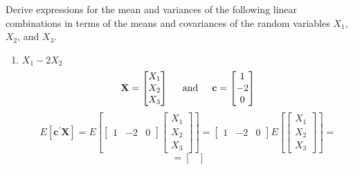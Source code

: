         Derive expressions for the mean and variances of the following linear combinations in
        terms of the means and covariances of the random variables $X_1$, $X_2$, and $X_3$.
        \begin{enumerate}[label=(\alph*)]
            \item $X_1 - 2X_2$
            \[
                \textbf{X}
                =
                \begin{bmatrix}
                    X_1 \\
                    X_2 \\
                    X_3
                \end{bmatrix}
                \hspace{0.2in}\text{and}\hspace{0.2in}
                \textbf{c}
                =
                \begin{bmatrix}
                    1 \\
                    -2 \\
                    0
                \end{bmatrix}
            \]
            \[
                E\left[\textbf{c}^\prime\textbf{X}\right]
                =
                E\left[
                \begin{bmatrix}
                    1 & -2 & 0
                \end{bmatrix}
                    \begin{bmatrix}
                    X_1 \\
                    X_2 \\
                    X_3
                \end{bmatrix}
                \right]
                =
                \begin{bmatrix}
                    1 & -2 & 0
                \end{bmatrix}                
                E\left[
                \begin{bmatrix}
                    X_1 \\
                    X_2 \\
                    X_3
                \end{bmatrix}
                \right]
                =
            \]
            \[
                =
                \begin{bmatrix}

\end{bmatrix}\]
\end{enumerate}
